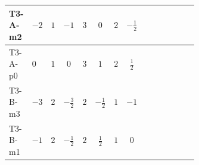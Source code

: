 \documentclass[8pt]{article}
\begin{document}
\begin{landscape}
\begin{longtable}{@{}llcccccc >{\raggedright\arraybackslash}p{0.21\linewidth} >{\raggedright\arraybackslash}p{0.21\linewidth} >{\raggedright\arraybackslash}p{0.21\linewidth}@{}}
T3-A-m2 & $-2$ & $1$ & $-1$ & $3$ & $0$ & $2$ & $-\frac{1}{2}$ & \scriptsize\adjustbox{max width=\linewidth}{$\begin{gathered} -12 \operatorname{Tr}\!\left({Y_u}\,\left({Y_u}\right)^{\dagger}\,{Y_u}\,\left({Y_u}\right)^{\dagger}\right)\end{gathered}$} & \scriptsize\adjustbox{max width=\linewidth}{$\begin{gathered} +4 {\lambda_5} \left({\lambda_5}\right)^{*}\end{gathered}$} & \scriptsize\adjustbox{max width=\linewidth}{$\begin{gathered} +\frac{9 {g_2}^4}{4}\end{gathered}$} \\
\midrule
T3-A-p0 & $0$ & $1$ & $0$ & $3$ & $1$ & $2$ & $\frac{1}{2}$ & \scriptsize\adjustbox{max width=\linewidth}{$\begin{gathered} -12 \operatorname{Tr}\!\left({Y_u}\,\left({Y_u}\right)^{\dagger}\,{Y_u}\,\left({Y_u}\right)^{\dagger}\right)\end{gathered}$} & \scriptsize\adjustbox{max width=\linewidth}{$\begin{gathered} +4 {\lambda_5} \left({\lambda_5}\right)^{*}\end{gathered}$} & \scriptsize\adjustbox{max width=\linewidth}{$\begin{gathered} +\frac{9 {g_2}^4}{4}\end{gathered}$} \\
\midrule
T3-B-m3 & $-3$ & $2$ & $-\frac{3}{2}$ & $2$ & $-\frac{1}{2}$ & $1$ & $-1$ & \scriptsize\adjustbox{max width=\linewidth}{$\begin{gathered} -12 \operatorname{Tr}\!\left({Y_u}\,\left({Y_u}\right)^{\dagger}\,{Y_u}\,\left({Y_u}\right)^{\dagger}\right)\end{gathered}$} & \scriptsize\adjustbox{max width=\linewidth}{$\begin{gathered} +4 {\lambda_5} \left({\lambda_5}\right)^{*}\end{gathered}$} & \scriptsize\adjustbox{max width=\linewidth}{$\begin{gathered} +\frac{9 {g_2}^4}{4}\end{gathered}$} \\
\midrule
T3-B-m1 & $-1$ & $2$ & $-\frac{1}{2}$ & $2$ & $\frac{1}{2}$ & $1$ & $0$ & \scriptsize\adjustbox{max width=\linewidth}{$\begin{gathered} -12 \operatorname{Tr}\!\left({Y_u}\,\left({Y_u}\right)^{\dagger}\,{Y_u}\,\left({Y_u}\right)^{\dagger}\right)\end{gathered}$} & \scriptsize\adjustbox{max width=\linewidth}{$\begin{gathered} +4 {\lambda_5} \left({\lambda_5}\right)^{*}\end{gathered}$} & \scriptsize\adjustbox{max width=\linewidth}{$\begin{gathered} +\frac{9 {g_2}^4}{4}\end{gathered}$} \\

\end{longtable}
\end{landscape}
\end{document}
